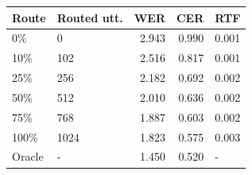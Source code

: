 \begin{tabular}{llrrl}
\toprule
Route & Routed utt. & WER & CER & RTF \\
\midrule
0\% & 0 & 2.943 & 0.990 & 0.001 \\
10\% & 102 & 2.516 & 0.817 & 0.001 \\
25\% & 256 & 2.182 & 0.692 & 0.002 \\
50\% & 512 & 2.010 & 0.636 & 0.002 \\
75\% & 768 & 1.887 & 0.603 & 0.002 \\
100\% & 1024 & 1.823 & 0.575 & 0.003 \\
Oracle & - & 1.450 & 0.520 & - \\
\bottomrule
\end{tabular}
